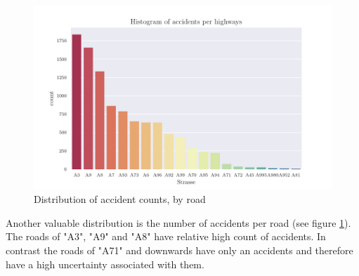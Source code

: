 \documentclass[a4paper,headsepline,footsepline,fontsize=11pt,BCOR=12mm,DIV=12]{report}
\begin{document}
\begin{figure}[H]
	\centering
	\includegraphics[scale=0.7]{../CorrAnalysis/data/BAYSIS/01_dataset/plots/baysis_dataset_hist_highway}
	\caption{Distribution of accident counts, by road}
	\label{img:baysis_dataset_dist_highway}
\end{figure}

Another valuable distribution is the number of accidents per road (see figure \ref{img:baysis_dataset_dist_highway}). The roads of "A3", "A9" and "A8" have relative high count of accidents. In contrast the roads of "A71" and downwards have only an accidents and therefore have a high uncertainty associated with them. 
\end{document}
